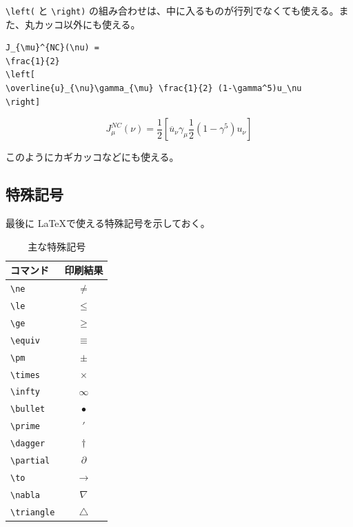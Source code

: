 \verb|\left(| と \verb|\right)| の組み合わせは、中に入るものが行列でなくても使える。また、丸カッコ以外にも使える。
\begin{reidai}
\begin{verbatim}
J_{\mu}^{NC}(\nu) =
\frac{1}{2}
\left[
\overline{u}_{\nu}\gamma_{\mu} \frac{1}{2} (1-\gamma^5)u_\nu
\right]
\end{verbatim}
\end{reidai}
\vspace*{-1.5em}
\begin{kekka}
  \begin{equation}
    J_{\mu}^{NC}(\nu) =
    \frac{1}{2}
    \left[
      \overline{u}_{\nu}\gamma_{\mu} \frac{1}{2} (1-\gamma^5)u_\nu
    \right]
  \end{equation}
  \vspace{0pt}
\end{kekka} \noindent
このようにカギカッコなどにも使える。

\subsection{特殊記号}
\label{sec:latex:symbol}

最後に \LaTeX で使える特殊記号を示しておく。
\begin{table}[H]
  \begin{center}
    \caption{主な特殊記号}
    \label{tab:symbol}
    \begin{tabular}{|lc|}
      \hline
      コマンド & 印刷結果 \\
      \hline \hline
      \verb|\ne| & $\ne$ \\
      \verb|\le| & $\le$ \\
      \verb|\ge| & $\ge$ \\
      \verb|\equiv| & $\equiv$ \\
      \verb|\pm| & $\pm$ \\
      \verb|\times| & $\times$ \\
      \verb|\infty| & $\infty$ \\
      \verb|\bullet| & $\bullet$ \\
      \verb|\prime| & $\prime$ \\
      \verb|\dagger| & $\dagger$ \\
      \verb|\partial| & $\partial$ \\
      \verb|\to| & $\to$ \\
      \verb|\nabla| & $\nabla$ \\
      \verb|\triangle| & $\triangle$ \\
      \hline
    \end{tabular}
  \end{center}
\end{table}

